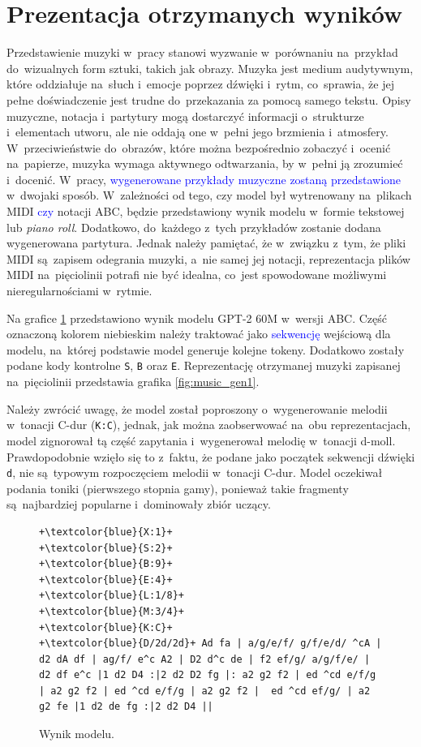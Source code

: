 \documentclass[data-science]{agh-wi} %
\begin{document}
\section{Prezentacja otrzymanych wyników}
Przedstawienie muzyki w~pracy stanowi wyzwanie w~porównaniu na~przykład do~wizualnych form sztuki, takich jak obrazy. Muzyka jest medium audytywnym, które oddziałuje na~słuch i~emocje poprzez dźwięki i~rytm, co~sprawia, że jej pełne doświadczenie jest trudne do~przekazania za pomocą samego tekstu. Opisy muzyczne, notacja i~partytury mogą dostarczyć informacji o~strukturze i~elementach utworu, ale nie oddają one w~pełni jego brzmienia i~atmosfery. W~przeciwieństwie do~obrazów, które można bezpośrednio zobaczyć i~ocenić na~papierze, muzyka wymaga aktywnego odtwarzania, by w~pełni ją zrozumieć i~docenić. W~pracy, \textcolor{blue}{wygenerowane przykłady muzyczne zostaną przedstawione} w~dwojaki sposób. W~zależności od tego, czy model był wytrenowany na~plikach MIDI \textcolor{blue}{czy} notacji ABC, będzie przedstawiony wynik modelu w~formie tekstowej lub \textit{piano roll}. Dodatkowo, do~każdego z~tych przykładów zostanie dodana wygenerowana partytura. Jednak należy pamiętać, że w~związku z~tym, że pliki MIDI są~zapisem odegrania muzyki, a~nie samej jej notacji, reprezentacja plików MIDI na~pięciolinii potrafi nie być idealna, co~jest spowodowane możliwymi nieregularnościami w~rytmie.

Na grafice \ref*{code:music_gen1} przedstawiono wynik modelu GPT-2 60M w~wersji ABC. Część oznaczoną kolorem niebieskim należy traktować jako \textcolor{blue}{sekwencję} wejściową dla modelu, na~której podstawie model generuje kolejne tokeny. Dodatkowo zostały podane kody kontrolne \texttt{S}, \texttt{B} oraz \texttt{E}. Reprezentację otrzymanej muzyki zapisanej na~pięciolinii przedstawia grafika \ref*{fig:music_gen1}.

Należy zwrócić uwagę, że model został poproszony o~wygenerowanie melodii w~tonacji C-dur (\texttt{K:C}), jednak, jak można zaobserwować na~obu reprezentacjach, model zignorował tą część zapytania i~wygenerował melodię w~tonacji d-moll. Prawdopodobnie wzięło się to z~faktu, że podane jako początek sekwencji dźwięki \texttt{d}, nie są~typowym rozpoczęciem melodii w~tonacji C-dur. Model oczekiwał podania toniki (pierwszego stopnia gamy), ponieważ takie fragmenty są~najbardziej popularne i~dominowały zbiór uczący.

\begin{figure}[ht!]
    \begin{verbatim}
+\textcolor{blue}{X:1}+
+\textcolor{blue}{S:2}+
+\textcolor{blue}{B:9}+
+\textcolor{blue}{E:4}+
+\textcolor{blue}{L:1/8}+
+\textcolor{blue}{M:3/4}+
+\textcolor{blue}{K:C}+
+\textcolor{blue}{D/2d/2d}+ Ad fa | a/g/e/f/ g/f/e/d/ ^cA | d2 dA df | ag/f/ e^c A2 | D2 d^c de | f2 ef/g/ a/g/f/e/ | d2 df e^c |1 d2 D4 :|2 d2 D2 fg |: a2 g2 f2 | ed ^cd e/f/g | a2 g2 f2 | ed ^cd e/f/g | a2 g2 f2 |  ed ^cd ef/g/ | a2 g2 fe |1 d2 de fg :|2 d2 D4 ||
    \end{verbatim}
    \caption{Wynik modelu.}\label{code:music_gen1}
\end{figure}
\end{document}
